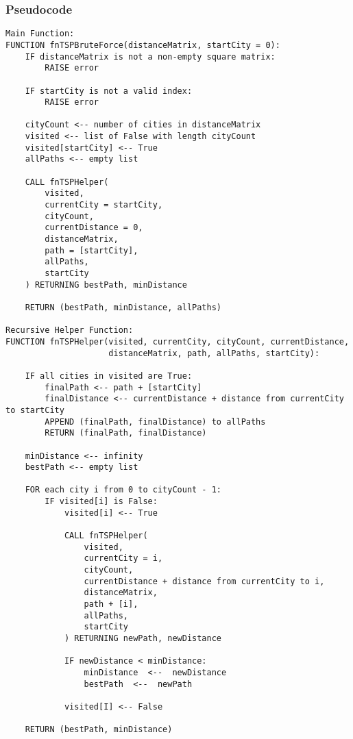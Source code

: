 \documentclass{article}
\begin{document}
\subsubsection*{Pseudocode}
\begin{lstlisting}
Main Function:
FUNCTION fnTSPBruteForce(distanceMatrix, startCity = 0):
    IF distanceMatrix is not a non-empty square matrix:
        RAISE error

    IF startCity is not a valid index:
        RAISE error

    cityCount <-- number of cities in distanceMatrix
    visited <-- list of False with length cityCount
    visited[startCity] <-- True
    allPaths <-- empty list

    CALL fnTSPHelper(
        visited,
        currentCity = startCity,
        cityCount,
        currentDistance = 0,
        distanceMatrix,
        path = [startCity],
        allPaths,
        startCity
    ) RETURNING bestPath, minDistance

    RETURN (bestPath, minDistance, allPaths)

Recursive Helper Function:
FUNCTION fnTSPHelper(visited, currentCity, cityCount, currentDistance,
                     distanceMatrix, path, allPaths, startCity):

    IF all cities in visited are True:
        finalPath <-- path + [startCity]
        finalDistance <-- currentDistance + distance from currentCity to startCity
        APPEND (finalPath, finalDistance) to allPaths
        RETURN (finalPath, finalDistance)

    minDistance <-- infinity
    bestPath <-- empty list

    FOR each city i from 0 to cityCount - 1:
        IF visited[i] is False:
            visited[i] <-- True

            CALL fnTSPHelper(
                visited,
                currentCity = i,
                cityCount,
                currentDistance + distance from currentCity to i,
                distanceMatrix,
                path + [i],
                allPaths,
                startCity
            ) RETURNING newPath, newDistance

            IF newDistance < minDistance:
                minDistance  <--  newDistance
                bestPath  <--  newPath

            visited[I] <-- False

    RETURN (bestPath, minDistance)
\end{lstlisting}
\end{document}
